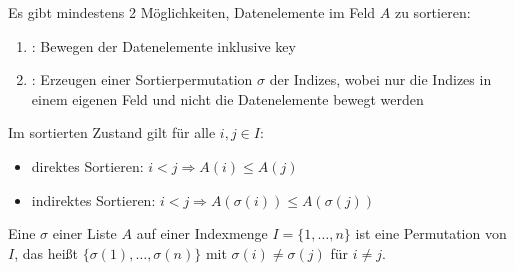 Es gibt mindestens 2 Möglichkeiten, Datenelemente im Feld $A$ zu sortieren:
\begin{enumerate}
	\item {}: Bewegen der Datenelemente inklusive key
	\item {}: Erzeugen einer Sortierpermutation $\sigma$ der Indizes, wobei nur die Indizes in einem eigenen Feld und nicht die Datenelemente bewegt werden
\end{enumerate}
Im sortierten Zustand gilt für alle $i,j\in I$:
\begin{itemize}
	\item direktes Sortieren: $i < j \Rightarrow A(i) \le A(j)$
	\item indirektes Sortieren: $i < j \Rightarrow A(\sigma(i)) \le A(\sigma(j))$
\end{itemize}

Eine  $\sigma$ einer Liste $A$ auf einer Indexmenge $I=\{1,\dots,n\}$ ist eine Permutation von $I$, das heißt $\{\sigma(1),\dots,\sigma(n)\}$ mit $\sigma(i)\neq\sigma(j)$ für $i\neq j$.